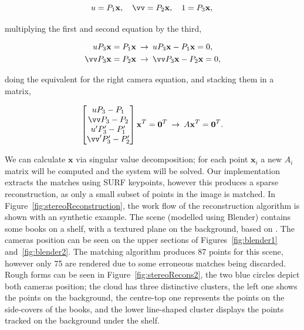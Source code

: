 \documentclass[12pt]{article}
\begin{document}
\begin{equation}
 u = P_1\mathbf{x}, \quad \vv = P_2\mathbf{x}, \quad 1 = P_3\mathbf{x},\\
\end{equation}

multiplying the first and second equation by the third,

\begin{equation}
\begin{aligned}
	uP_3\mathbf{x} &=  P_1\mathbf{x} \: \rightarrow  \: uP_3\mathbf{x} - P_1\mathbf{x} = 0,\\
	\vv P_3\mathbf{x} &= P_2\mathbf{x} \: \rightarrow \: \vv P_3\mathbf{x} - P_2\mathbf{x} = 0,
\end{aligned}
\end{equation}

doing the equivalent for the right camera equation, and stacking them in a matrix,

\begin{equation}
	\begin{bmatrix}
	uP_3 - P_1 \\
	\vv P_3 - P_2 \\
	u'P_3' - P_1' \\
	\vv' P_3' - P_2'	
	\end{bmatrix}
	\mathbf{x}^T
	= \mathbf{0}^T \: \rightarrow  \: A\mathbf{x}^T = \mathbf{0}^T.
\end{equation}

We can calculate $\mathbf{x}$ via singular value decomposition; for each point $\mathbf{x}_i$ a new $A_i$ matrix will be computed and the system will be solved.
Our implementation extracts the matches using SURF keypoints, however this produces a sparse reconstruction, as only a small subset of points in the image is matched.
In Figure~\ref{fig:stereoReconstruction}, the work flow of the reconstruction algorithm is shown with an synthetic example.
The scene (modelled using Blender) contains some books on a shelf, with a textured plane on the background, based on \cite{Archemi2014}.
The cameras position can be seen on the upper sections of Figures~\ref{fig:blender1} and~\ref{fig:blender2}.
The matching algorithm produces 87 points for this scene, however only 75 are rendered due to some erroneous matches being discarded.
Rough forms can be seen in Figure~\ref{fig:stereoRecons2}, the two blue circles depict both cameras position; the cloud has three distinctive clusters, the left one shows the points on the background, the centre-top one represents the points on the side-covers of the books, and the lower line-shaped cluster displays the points tracked on the background under the shelf.
\end{document}
